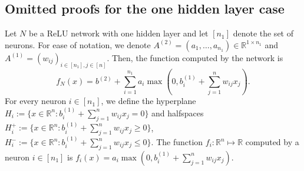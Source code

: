 \documentclass{article}
\begin{document}
\subsection{Omitted proofs for the one hidden layer case}
\label{sec:omitted_proofs_shallow}
Let $N$ be a ReLU network with one hidden layer and let $[n_1]$ denote the set of neurons.
For ease of notation, we denote $A^{(2)}=(a_1,\dots,a_{n_1})\in \mathbb{R}^{1\times n_1}$ and $A^{(1)}=(w_{ij})_{i\in [n_1],j\in [n]}$.
Then, the function computed by the network is
\[
f_N(x)=b^{(2)}+\sum_{i=1}^{n_1} a_i \max(0, b^{(1)}_i + \sum_{j=1}^n w_{ij}x_j).
\]
For every neuron $i\in [n_1]$, we define the hyperplane $H_i := \{x\in \mathbb{R}^n : b^{(1)}_i + \sum_{j=1}^n w_{ij}x_j = 0\}$ and halfspaces $H_i^+ := \{x\in \mathbb{R}^n : b^{(1)}_i + \sum_{j=1}^n w_{ij}x_j \geq 0\}$, $H_i^- := \{x\in \mathbb{R}^n : b^{(1)}_i + \sum_{j=1}^n w_{ij}x_j \leq 0\}$.
The function $f_i:\mathbb{R}^n\mapsto \mathbb{R}$ computed by a neuron $i\in [n_1]$ is $f_i(x)=a_i \max(0, b^{(1)}_i + \sum_{j=1}^n w_{ij}x_j)$.
\end{document}
